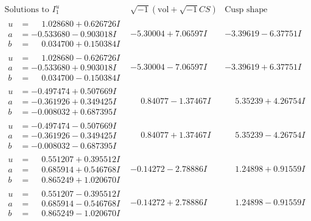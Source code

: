 \documentclass[1p]{elsarticle_modified}
\theoremstyle{definition}
\newcommand{\I}{\sqrt{-1}}
\begin{document}
$$\begin{array}{c|c|c}  
\text{Solutions to }I^u_{1}& \I (\text{vol} + \sqrt{-1}CS) & \text{Cusp shape}\\
 \hline 
\begin{aligned}
u &= \phantom{-}1.028680 + 0.626726 I \\
a &= -0.533680 - 0.903018 I \\
b &= \phantom{-}0.034700 + 0.150384 I\end{aligned}
 & -5.30004 + 7.06597 I & -3.39619 - 6.37751 I \\ \hline\begin{aligned}
u &= \phantom{-}1.028680 - 0.626726 I \\
a &= -0.533680 + 0.903018 I \\
b &= \phantom{-}0.034700 - 0.150384 I\end{aligned}
 & -5.30004 - 7.06597 I & -3.39619 + 6.37751 I \\ \hline\begin{aligned}
u &= -0.497474 + 0.507669 I \\
a &= -0.361926 + 0.349425 I \\
b &= -0.008032 + 0.687395 I\end{aligned}
 & \phantom{-}0.84077 - 1.37467 I & \phantom{-}5.35239 + 4.26754 I \\ \hline\begin{aligned}
u &= -0.497474 - 0.507669 I \\
a &= -0.361926 - 0.349425 I \\
b &= -0.008032 - 0.687395 I\end{aligned}
 & \phantom{-}0.84077 + 1.37467 I & \phantom{-}5.35239 - 4.26754 I \\ \hline\begin{aligned}
u &= \phantom{-}0.551207 + 0.395512 I \\
a &= \phantom{-}0.685914 + 0.546768 I \\
b &= \phantom{-}0.865249 + 1.020670 I\end{aligned}
 & -0.14272 - 2.78886 I & \phantom{-}1.24898 + 0.91559 I \\ \hline\begin{aligned}
u &= \phantom{-}0.551207 - 0.395512 I \\
a &= \phantom{-}0.685914 - 0.546768 I \\
b &= \phantom{-}0.865249 - 1.020670 I\end{aligned}
 & -0.14272 + 2.78886 I & \phantom{-}1.24898 - 0.91559 I \\ \hline\begin{aligned}

\end{aligned}
\end{array}$$
\end{document}

